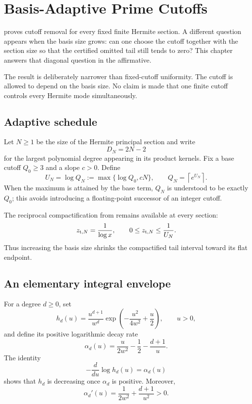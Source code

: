 \chapter{Basis-Adaptive Prime Cutoffs}
\label{ch:adaptive-cutoff}

 proves cutoff removal for every fixed finite
Hermite section. A different question appears when the basis size grows:
can one choose the cutoff together with the section size so that the certified
omitted tail still tends to zero? This chapter answers that diagonal question
in the affirmative.

The result is deliberately narrower than fixed-cutoff uniformity. The cutoff
is allowed to depend on the basis size. No claim is made that one finite
cutoff controls every Hermite mode simultaneously.

\section{Adaptive schedule}

Let $N\ge1$ be the size of the Hermite principal section and write
\[
 D_N=2N-2
\]
for the largest polynomial degree appearing in its product kernels. Fix a
base cutoff $Q_0\ge3$ and a slope $c>0$. Define
\[
 U_N=\log Q_N:=\max\{\log Q_0,cN\},
 \qquad
 Q_N=\left\lceil e^{U_N}\right\rceil.
\]
When the maximum is attained by the base term, $Q_N$ is understood to be
exactly $Q_0$; this avoids introducing a floating-point successor of an
integer cutoff.

The reciprocal compactification from  remains
available at every section:
\[
 z_{{\rm t},N}=\frac1{\log x},
 \qquad
 0\le z_{{\rm t},N}\le\frac1{U_N}.
\]
Thus increasing the basis size shrinks the compactified tail interval toward
its flat endpoint.

\section{An elementary integral envelope}

For a degree $d\ge0$, set
\[
 h_d(u)
 =
 \frac{u^{d+1}}{w^d}
 \exp\!\left(-\frac{u^2}{4w^2}+\frac u2\right),
 \qquad u>0,
\]
and define its positive logarithmic decay rate
\[
 \alpha_d(u)
 =
 \frac{u}{2w^2}-\frac12-\frac{d+1}{u}.
\]
The identity
\[
 -\frac{d}{du}\log h_d(u)=\alpha_d(u)
\]
shows that $h_d$ is decreasing once $\alpha_d$ is positive. Moreover,
\[
 \alpha_d'(u)
 =
 \frac1{2w^2}+\frac{d+1}{u^2}>0.
\]

